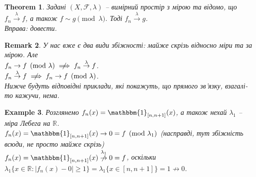 \documentclass[a4paper, 10pt]{article}
\theoremstyle{theoremdd}
\newtheorem{theorem}{Theorem}[subsection]
\newtheorem{example}[theorem]{Example}
\newtheorem{remark}[theorem]{Remark}
\newcommand\tomeasure[1]{\overset{{#1}}{\to}}
\newcommand\nottomeasure[1]{\overset{{#1}}{\centernot\to}}
\begin{document}
\begin{theorem}
Задані $(X,\mathcal{F},\lambda)$ -- вимірний простір з мірою та відомо, що $f_n \tomeasure{\lambda} f$, а також $f \sim g \pmod \lambda$. Тоді $f_n \tomeasure{\lambda} g$.\\
\textit{Вправа: довести.}
\end{theorem}

\begin{remark}
У нас вже є два види збіжності: майже скрізь відносно міри та за мірою. Але\\
$f_n \to f \pmod \lambda \centernot\implies f_n \tomeasure{\lambda} f$.\\
$f_n \tomeasure{\lambda} f \centernot\implies f_n \to f \pmod \lambda$.\\
Нижче будуть відповідні приклади, які покажуть, що прямого зв'язку, взагалі-то кажучи, нема.
\end{remark}

\begin{example}
Розглянемо $f_n(x) = \mathbbm{1}_{[n,n+1]}(x)$, а також нехай $\lambda_1$ -- міра Лебега на $\mathbb{R}$.\\
$f_n(x) = \mathbbm{1}_{[n,n+1]}(x) \to 0 = f \pmod {\lambda_1}$ (насправді, тут збіжність всюди, не просто майже скрізь)\\
$f_n(x) = \mathbbm{1}_{[n,n+1]}(x) \nottomeasure{\lambda_1} 0 = f$, оскільки $\lambda_1\{x \in \mathbb{R}: |f_n(x)-0| \geq 1 \} = \lambda_1 \{x \in [n,n+1] \} = 1 \not\to 0$.
\end{example}
\end{document}
